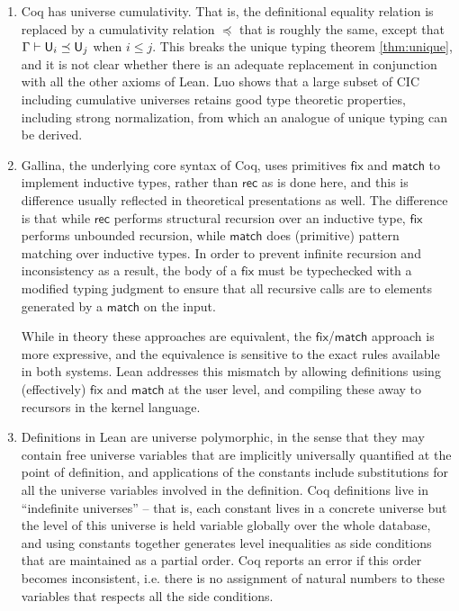 \begin{enumerate}
\item Coq has universe cumulativity. That is, the definitional equality relation is replaced by a cumulativity relation $\preceq$ that is roughly the same, except that $\Gamma\vdash\U_i\preceq \U_j$ when $i\le j$. This breaks the unique typing theorem \autoref{thm:unique}, and it is not clear whether there is an adequate replacement in conjunction with all the other axioms of Lean. Luo \cite{ecc} shows that a large subset of CIC including cumulative universes retains good type theoretic properties, including strong normalization, from which an analogue of unique typing can be derived.
\item Gallina, the underlying core syntax of Coq, uses primitives $\mathsf{fix}$ and $\mathsf{match}$ to implement inductive types, rather than $\mathsf{rec}$ as is done here, and this is difference usually reflected in theoretical presentations as well. The difference is that while $\mathsf{rec}$ performs structural recursion over an inductive type, $\mathsf{fix}$ performs unbounded recursion, while $\mathsf{match}$ does (primitive) pattern matching over inductive types. In order to prevent infinite recursion and inconsistency as a result, the body of a $\mathsf{fix}$ must be typechecked with a modified typing judgment to ensure that all recursive calls are to elements generated by a $\mathsf{match}$ on the input.

While in theory these approaches are equivalent, the $\mathsf{fix}$/$\mathsf{match}$ approach is more expressive, and the equivalence is sensitive to the exact rules available in both systems. Lean addresses this mismatch by allowing definitions using (effectively) $\mathsf{fix}$ and $\mathsf{match}$ at the user level, and compiling these away to recursors in the kernel language.

\item Definitions in Lean are universe polymorphic, in the sense that they may contain free universe variables that are implicitly universally quantified at the point of definition, and applications of the constants include substitutions for all the universe variables involved in the definition. Coq definitions live in ``indefinite universes'' -- that is, each constant lives in a concrete universe but the level of this universe is held variable globally over the whole database, and using constants together generates level inequalities as side conditions that are maintained as a partial order. Coq reports an error if this order becomes inconsistent, i.e. there is no assignment of natural numbers to these variables that respects all the side conditions.


\end{enumerate}

